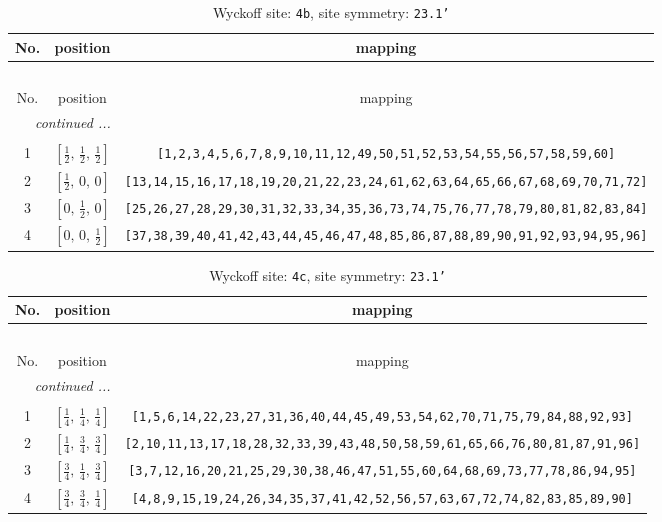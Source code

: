 \documentclass[fleqn,8pt]{jsarticle}
\begin{document}
\begin{longtable}{ccc}
\caption{Wyckoff site: {\tt 4b}, site symmetry: {\tt 23.1'}}
 \\
 \hline \hline
No. & position & mapping \\ \hline \endfirsthead

\multicolumn{2}{l}{\tablename\ \thetable{}} \\
 \hline \hline
No. & position & mapping \\ \hline \endhead

 \hline \hline
\multicolumn{2}{r}{\footnotesize\it continued ...} \\ \endfoot

 \hline \hline
\multicolumn{2}{r}{} \\ \endlastfoot

1 & $\left[ \frac{1}{2},\, \frac{1}{2},\, \frac{1}{2} \right]$ & {\tt [1,2,3,4,5,6,7,8,9,10,11,12,49,50,51,52,53,54,55,56,57,58,59,60]} \\ \hline
2 & $\left[ \frac{1}{2},\, 0,\, 0 \right]$ & {\tt [13,14,15,16,17,18,19,20,21,22,23,24,61,62,63,64,65,66,67,68,69,70,71,72]} \\ \hline
3 & $\left[ 0,\, \frac{1}{2},\, 0 \right]$ & {\tt [25,26,27,28,29,30,31,32,33,34,35,36,73,74,75,76,77,78,79,80,81,82,83,84]} \\ \hline
4 & $\left[ 0,\, 0,\, \frac{1}{2} \right]$ & {\tt [37,38,39,40,41,42,43,44,45,46,47,48,85,86,87,88,89,90,91,92,93,94,95,96]} \\
\end{longtable}
\renewcommand{\arraystretch}{1.2}
\begin{longtable}{ccc}
\caption{Wyckoff site: {\tt 4c}, site symmetry: {\tt 23.1'}}
 \\
 \hline \hline
No. & position & mapping \\ \hline \endfirsthead

\multicolumn{2}{l}{\tablename\ \thetable{}} \\
 \hline \hline
No. & position & mapping \\ \hline \endhead

 \hline \hline
\multicolumn{2}{r}{\footnotesize\it continued ...} \\ \endfoot

 \hline \hline
\multicolumn{2}{r}{} \\ \endlastfoot

1 & $\left[ \frac{1}{4},\, \frac{1}{4},\, \frac{1}{4} \right]$ & {\tt [1,5,6,14,22,23,27,31,36,40,44,45,49,53,54,62,70,71,75,79,84,88,92,93]} \\ \hline
2 & $\left[ \frac{1}{4},\, \frac{3}{4},\, \frac{3}{4} \right]$ & {\tt [2,10,11,13,17,18,28,32,33,39,43,48,50,58,59,61,65,66,76,80,81,87,91,96]} \\ \hline
3 & $\left[ \frac{3}{4},\, \frac{1}{4},\, \frac{3}{4} \right]$ & {\tt [3,7,12,16,20,21,25,29,30,38,46,47,51,55,60,64,68,69,73,77,78,86,94,95]} \\ \hline
4 & $\left[ \frac{3}{4},\, \frac{3}{4},\, \frac{1}{4} \right]$ & {\tt [4,8,9,15,19,24,26,34,35,37,41,42,52,56,57,63,67,72,74,82,83,85,89,90]} \\
\end{longtable}
\end{document}
